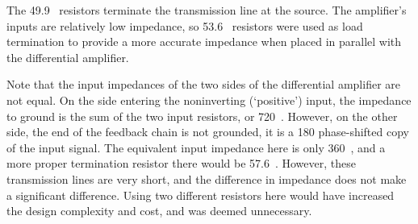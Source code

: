 The 49.9~\Ohm{} resistors terminate the transmission line at the
source. The amplifier's inputs are relatively low impedance, so 53.6~\Ohm{}
resistors were used as load termination to provide a more accurate impedance when
placed in parallel with the differential amplifier.

Note that the input impedances of the two sides of the differential amplifier
are not equal. On the side entering the noninverting (`positive') input, the
impedance to ground is the sum of the two input resistors, or 720~\Ohm{}.
However, on the other side, the end of the feedback chain is not grounded, it is
a 180\dg{} phase-shifted copy of the input signal. The equivalent input impedance
here is only 360~\Ohm{}, and a more proper termination resistor there
would be 57.6~\Ohm{}. However, these transmission lines are very short,
and the difference in impedance does not make a significant difference. Using
two different resistors here would have increased the design complexity and cost,
and was deemed unnecessary. 
    
